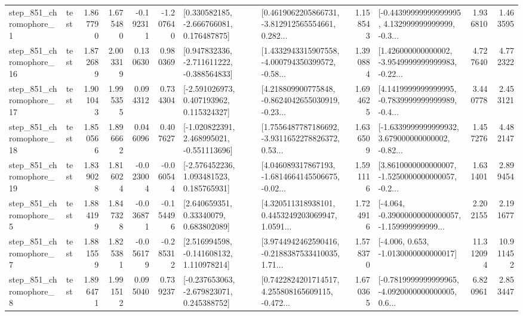 \begin{tabular}{llrrrrllrlrr}
   step\_851\_chromophore\_1 &      test &      1.867790 &    1.675480 &     -0.192311 & -1.207640 &    [0.330582185, -2.666766081, 0.176487875] &  [0.4619062205866731, -3.812912565554661, 0.282... &       1.158543 &  [-0.44399999999999995, 4.132999999999999, -0.3... &            1.936810 &          1.463595 \\
  step\_851\_chromophore\_16 &      test &      1.872689 &    2.003319 &      0.130630 &  0.980369 &   [0.947832336, -2.711611222, -0.388564833] &  [1.4332943315907558, -4.000794350399572, -0.58... &       1.390884 &  [1.426000000000002, -3.9549999999999983, -0.22... &            4.727640 &          4.772322 \\
  step\_851\_chromophore\_17 &      test &      1.901043 &    1.995355 &      0.094312 &  0.734304 &    [-2.591026973, 0.407193962, 0.115324327] &  [4.218809900775848, -0.8624042655030919, -0.23... &       1.694625 &  [4.1419999999999995, -0.7839999999999989, -0.4... &            3.440778 &          2.453121 \\
  step\_851\_chromophore\_18 &      test &      1.850566 &    1.896662 &      0.046096 &  0.407627 &   [-1.020822391, 2.468995021, -0.551113696] &  [1.7556487787186692, -3.9311652278826372, 0.53... &       1.636509 &  [-1.6339999999999932, 3.679000000000002, -0.82... &            1.457276 &          4.482147 \\
  step\_851\_chromophore\_19 &      test &      1.839028 &    1.816024 &     -0.023004 & -0.060544 &    [-2.576452236, 1.093481523, 0.185765931] &  [4.046089317867193, -1.6814664145506675, -0.02... &       1.591116 &  [3.8610000000000007, -1.5250000000000057, -0.2... &            1.631401 &          2.899454 \\
   step\_851\_chromophore\_5 &      test &      1.884199 &    1.847328 &     -0.036871 & -0.154496 &      [2.640659351, 0.33340079, 0.683802089] &  [4.320511318938101, 0.4453249203069947, 1.0591... &       1.724916 &  [-4.064, -0.39000000000000057, -1.159999999999... &            2.202155 &          2.191677 \\
   step\_851\_chromophore\_7 &      test &      1.881559 &    1.825381 &     -0.056179 & -0.285312 &    [2.516994598, -0.141608132, 1.110978214] &  [3.9744942462590416, -0.2188387533410035, 1.71... &       1.578370 &               [-4.006, 0.653, -1.0130000000000017] &           11.312094 &         10.911452 \\
   step\_851\_chromophore\_8 &      test &      1.896471 &    1.991512 &      0.095040 &  0.739237 &   [-0.237653063, -2.679823071, 0.245388752] &  [0.7422824201714517, 4.255808165609115, -0.472... &       1.670365 &  [-0.7819999999999965, -4.0920000000000005, 0.6... &            6.820961 &          2.853447 \\

\end{tabular}
